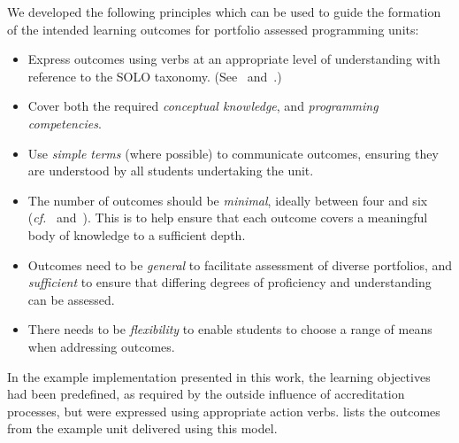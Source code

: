 We developed the following principles which can be used to guide the formation of the intended learning outcomes for portfolio assessed programming units:
\begin{itemize}
  \item Express outcomes using verbs at an appropriate level of understanding with reference to the SOLO taxonomy. (See~\cite{Biggs:2007} and~\cite{Biggs:1982}.)
  \item Cover both the required \emph{conceptual knowledge}, and \emph{programming competencies}.
  \item Use \emph{simple terms} (where possible) to communicate outcomes, ensuring they are understood by all students undertaking the unit.
  \item The number of outcomes should be \emph{minimal}, ideally between four and six (\emph{cf.}~\cite{Biggs:2007} and~\cite{Gardner:1994}). This is to help ensure that each outcome covers a meaningful body of knowledge to a sufficient depth.
  \item Outcomes need to be \emph{general} to facilitate assessment of diverse portfolios, and \emph{sufficient} to ensure that differing degrees of proficiency and understanding can be assessed.
  \item There needs to be \emph{flexibility} to enable students to choose a range of means when addressing outcomes.
\end{itemize}

In the example implementation presented in this work, the learning objectives had been predefined, as required by the outside influence of accreditation processes, but were expressed using appropriate action verbs.  lists the outcomes from the example unit delivered using this model.

